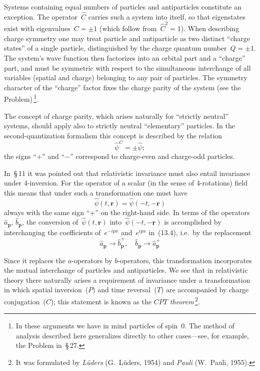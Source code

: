Systems containing equal numbers of particles and antiparticles constitute an exception. The operator~$\hat{C}$ carries such a system into itself, so that eigenstates exist with eigenvalues~$C = \pm 1$ (which follow from~$\hat{C}^2 = 1$). When describing charge symmetry one may treat particle and antiparticle as two distinct ``charge states'' of a single particle, distinguished by the charge quantum number~$Q = \pm 1$. The system's wave function then factorizes into an orbital part and a ``charge'' part, and must be symmetric with respect to the simultaneous interchange of all variables (spatial and charge) belonging to any pair of particles. The symmetry character of the ``charge'' factor fixes the charge parity of the system (see the Problem)\,\footnote{In these arguments we have in mind particles of spin~0. The method of analysis described here generalizes directly to other cases---see, for example, the Problem in~\S\,27.}.

The concept of charge parity, which arises naturally for ``strictly neutral'' systems, should apply also to
strictly neutral ``elementary'' particles. In the second-quantization formalism this concept is described by the relation
\begin{equation}
\hat{\psi}^C = \pm\hat{\psi};
\tag{13.8}
\end{equation}
the signs ``$+$'' and ``$-$'' correspond to charge-even and charge-odd particles.

In~\S\,11 it was pointed out that relativistic invariance must also entail invariance under 4-inversion. For the operator of a scalar (in the sense of 4-rotations) field this means that under such a transformation one must have
\[
\hat{\psi}(t,\mathbf{r}) = \hat{\psi}(-t,-\mathbf{r})
\]
always with the same sign ``$+$'' on the right-hand side. In terms of the operators~$\hat{a}_\mathbf{p}$, $\hat{b}_\mathbf{p}$, the conversion of~$\hat{\psi}(t,\mathbf{r})$ into~$\hat{\psi}(-t,-\mathbf{r})$ is accomplished by interchanging the coefficients of~$e^{-ipx}$ and~$e^{ipx}$ in~(13.4), i.e.\ by the replacement
\begin{equation}
\hat{a}_\mathbf{p} \to \hat{b}^+_\mathbf{p}, \quad \hat{b}_\mathbf{p} \to \hat{a}^+_\mathbf{p}
\tag{13.9}
\end{equation}

Since it replaces the $a$-operators by $b$-operators, this transformation incorporates the mutual interchange of particles and antiparticles. We see that in relativistic theory there naturally arises a requirement of invariance under a transformation in which spatial inversion~($P$) and time reversal~($T$) are accompanied by charge conjugation~($C$); this statement is known as the \emph{$CPT$ theorem}\,\footnote{It was formulated by \emph{L\"uders} (G.~L\"uders, 1954) and \emph{Pauli} (W.~Pauli, 1955).}.

